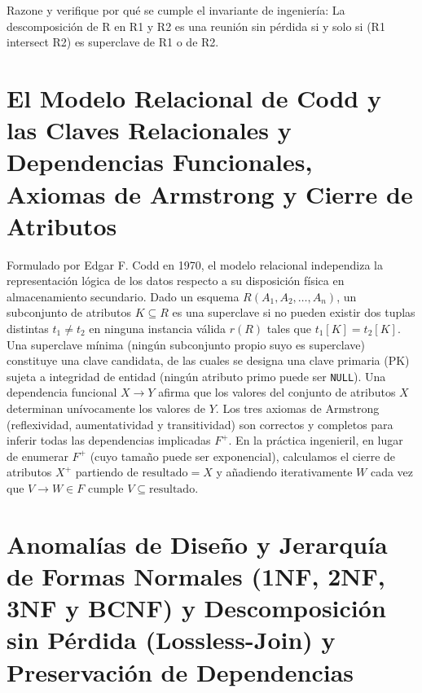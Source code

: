 \documentclass{book}
\begin{document}
\begin{tcolorbox}[title={Autoficha}, studiumcheck, breakable]

Razone y verifique por qué se cumple el invariante de ingeniería: La descomposición de R en R1 y R2 es una reunión sin pérdida si y solo si (R1 intersect R2) es superclave de R1 o de R2.
\end{tcolorbox}

\section{El Modelo Relacional de Codd y las Claves Relacionales y Dependencias Funcionales, Axiomas de Armstrong y Cierre de Atributos}

Formulado por Edgar F. Codd en 1970, el modelo relacional independiza la representación lógica de los datos respecto a su disposición física en almacenamiento secundario. Dado un esquema \(R(A_1, A_2, \dots, A_n)\), un subconjunto de atributos \(K \subseteq R\) es una superclave si no pueden existir dos tuplas distintas \(t_1 \neq t_2\) en ninguna instancia válida \(r(R)\) tales que \(t_1[K] = t_2[K]\). Una superclave mínima (ningún subconjunto propio suyo es superclave) constituye una clave candidata, de las cuales se designa una clave primaria (PK) sujeta a integridad de entidad (ningún atributo primo puede ser \texttt{NULL}).
Una dependencia funcional \(X \to Y\) afirma que los valores del conjunto de atributos \(X\) determinan unívocamente los valores de \(Y\). Los tres axiomas de Armstrong (reflexividad, aumentatividad y transitividad) son correctos y completos para inferir todas las dependencias implicadas \(F^+\). En la práctica ingenieril, en lugar de enumerar \(F^+\) (cuyo tamaño puede ser exponencial), calculamos el cierre de atributos \(X^+\) partiendo de \(\text{resultado} = X\) y añadiendo iterativamente \(W\) cada vez que \(V \to W \in F\) cumple \(V \subseteq \text{resultado}\).

\section{Anomalías de Diseño y Jerarquía de Formas Normales (1NF, 2NF, 3NF y BCNF) y Descomposición sin Pérdida (Lossless-Join) y Preservación de Dependencias}
\end{document}

